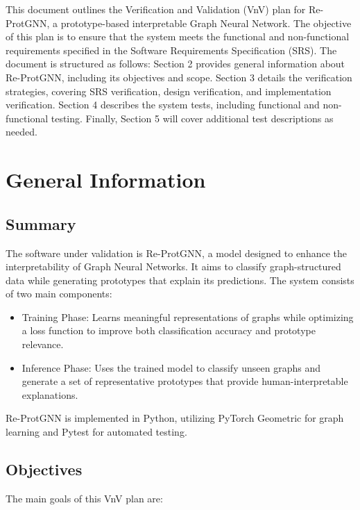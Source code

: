 \documentclass[12pt, titlepage]{article}
\begin{document}

This document outlines the Verification and Validation (VnV) plan for Re-ProtGNN, a prototype-based interpretable Graph Neural Network. The objective of this plan is to ensure that the system meets the functional and non-functional requirements specified in the Software Requirements Specification (SRS). The document is structured as follows: Section 2 provides general information about Re-ProtGNN, including its objectives and scope. Section 3 details the verification strategies, covering SRS verification, design verification, and implementation verification. Section 4 describes the system tests, including functional and non-functional testing. Finally, Section 5 will cover additional test descriptions as needed.

\section{General Information}

\subsection{Summary}

The software under validation is Re-ProtGNN, a model designed to enhance the interpretability of Graph Neural Networks. It aims to classify graph-structured data while generating prototypes that explain its predictions. The system consists of two main components:

\begin{itemize}
    \item Training Phase: Learns meaningful representations of graphs while optimizing a loss function to improve both classification accuracy and prototype relevance.
    \item Inference Phase: Uses the trained model to classify unseen graphs and generate a set of representative prototypes that provide human-interpretable explanations.
\end{itemize}

Re-ProtGNN is implemented in Python, utilizing PyTorch Geometric for graph learning and Pytest for automated testing.


\subsection{Objectives}

The main goals of this VnV plan are:
\end{document}
